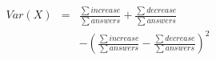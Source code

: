 \documentclass[12pt]{article}
\begin{document}
\begin{eqnarray}
    Var(X) &=& \frac{\sum increase}{\sum answers}  + \frac{\sum decrease}{\sum answers} \nonumber \\
    && - \left( \frac{\sum increase}{\sum answers} - \frac{\sum decrease}{\sum answers}\right)^2
\end{eqnarray}
\end{document}
